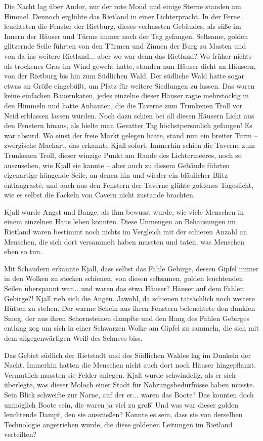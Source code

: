 Die Nacht lag über Andor, nur der rote Mond und einige Sterne standen am Himmel. Dennoch erglühte das Rietland in einer Lichterpracht. In der Ferne leuchteten die Fenster der Rietburg, dieses verhassten Gebäudes, als säße im Innern der Häuser und Türme immer noch der Tag gefangen. Seltsame, golden glitzernde Seile führten von den Türmen und Zinnen der Burg zu Masten und von da ins weitere Rietland... aber wo war denn das Rietland? Wo früher nichts als trockenes Gras im Wind geweht hatte, standen nun Häuser dicht an Häusern, von der Rietburg bis hin zum Südlichen Wald. Der südliche Wald hatte sogar etwas an Größe eingebüßt, um Platz für weitere Siedlungen zu lassen. Das waren keine einfachen Bauernkaten, jedes einzelne dieser Häuser ragte mehrstöckig in den Himmeln und hatte Anbauten, die die Taverne zum Trunkenen Troll vor Neid erblassen lassen würden. Noch dazu schien bei all diesen Häusern Licht aus den Fenstern hinaus, als hielte man Gevatter Tag höchstpersönlich gefangen! Es war absurd. Wo einst der freie Markt gelegen hatte, stand nun ein breiter Turm – zwergische Machart, das erkannte Kjall sofort. Immerhin schien die Taverne zum Trunkenen Troll, dieser winzige Punkt am Rande des Lichtermeeres, noch so auszusehen, wie Kjall sie kannte – aber auch zu diesem Gebäude führten eigenartige hängende Seile, an denen hin und wieder ein bläulicher Blitz entlangraste, und auch aus den Fenstern der Taverne glühte goldenes Tageslicht, wie es selbst die Fackeln von Cavern nicht zustande brachten.

Kjall wurde Angst und Bange, als ihm bewusst wurde, wie viele Menschen in einem einzelnen Haus leben konnten. Diese Unmengen an Behausungen im Rietland waren bestimmt noch nichts im Vergleich mit der schieren Anzahl an Menschen, die sich dort versammelt haben mussten und taten, was Menschen eben so tun.

Mit Schaudern erkannte Kjall, dass selbst das Fahle Gebirge, dessen Gipfel immer in den Wolken zu stecken schienen, von diesen seltsamen, golden leuchtenden Seilen überspannt war... und waren das etwa Häuser? Häuser auf dem Fahlen Gebirge?! Kjall rieb sich die Augen. Jawohl, da schienen tatsächlich noch weitere Hütten zu stehen. Der warme Schein aus ihren Fenstern beleuchtete den dunklen Smog, der aus ihren Schornsteinen dampfte und den Hang des Fahlen Gebirges entlang zog um sich in einer Schwarzen Wolke am Gipfel zu sammeln, die sich mit dem allgegenwärtigen Weiß des Schnees biss.

Das Gebiet südlich der Rietstadt und des Südlichen Waldes lag im Dunkeln der Nacht. Immerhin hatten die Menschen nicht auch dort noch Häuser hingepflanzt. Vermutlich mussten sie Felder anlegen. Kjall wurde schwindelig, als er sich überlegte, was dieser Moloch einer Stadt für Nahrungsbedürfnisse haben musste. Sein Blick schweifte zur Narne, auf der er... waren das Boote? Das konnten doch unmöglich Boote sein, die waren ja viel zu groß! Und was war dieser golden leuchtende Dampf, den sie ausstießen? Konnte es sein, dass sie von derselben Technologie angetrieben wurde, die diese goldenen Leitungen im Rietland verteilten?

